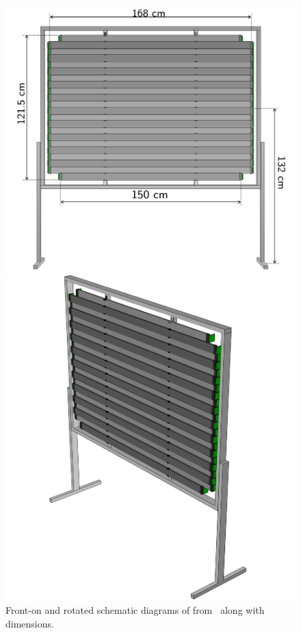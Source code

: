 \begin{figure}[h]
  \begin{minipage}[t]{.55\linewidth}
    \includegraphics[width=\linewidth]{files/figures/hptpc_beam_flux/uToF_sketch}
  \end{minipage}
  \hfill
  \begin{minipage}[t]{.41\linewidth}
    \includegraphics[width=\linewidth]{files/figures/hptpc_beam_flux/uTOF_rot}
  \end{minipage}
  \caption[Schematic diagrams of \SThree]{Front-on and rotated schematic diagrams of \SThree from~\cite{s3Paper} along with dimensions.}
  \label{fig:s3Diag}
\end{figure}

